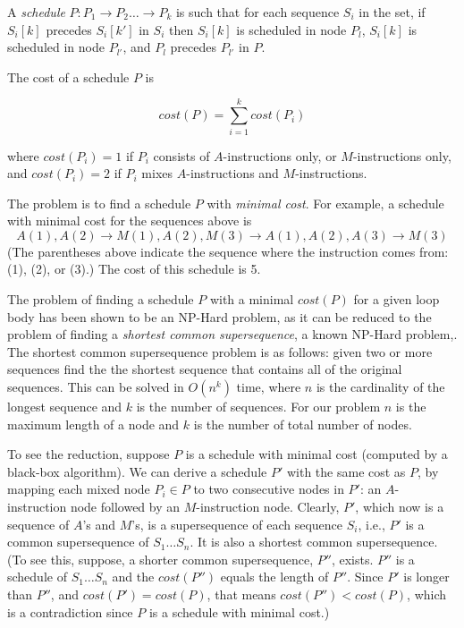 \documentclass[sigconf, screen, natbib=false, dvipsnames, table]{acmart}
\theoremstyle{definition}
\begin{document}
{A \emph{schedule} $P: P_1 \rightarrow P_2 \dots \rightarrow P_k$ is such that for each sequence 
$S_i$ in the set, if $S_i[k]$ precedes $S_i[k']$ in $S_i$ then $S_i[k]$ is scheduled in node $P_l$, $S_i[k]$ 
is scheduled in node $P_{l'}$, and $P_l$ precedes $P_{l'}$ in $P$. 

The cost of a schedule $P$ is 

\begin{equation}
\mathit{cost}(P) = \sum_{i=1}^k \mathit{cost}(P_i)
\end{equation}

where $\mathit{cost}(P_i) = 1$ if $P_i$ consists of $A$-instructions only, or $M$-instructions only, 
and $\mathit{cost}(P_i) = 2$ if $P_i$ mixes $A$-instructions and $M$-instructions. 

The problem is to find a schedule $P$ with \emph{minimal cost}. For example, 
a schedule with minimal cost for the sequences above is
\[ A(1), A(2) \rightarrow M(1), A(2), M(3) \rightarrow A(1), A(2), A(3) \rightarrow M(3) \]
(The parentheses above indicate the sequence where the instruction comes from: (1), (2), or (3).)
The cost of this schedule is 5. 

The problem of finding a schedule $P$ with a minimal $cost(P)$ for a given loop body has been shown
to be an NP-Hard problem, as it can be reduced to the problem of finding a \emph{shortest common supersequence}, 
a known NP-Hard problem\cite{Maier1978},\cite{Vazirani2010}. The shortest common supersequence problem is as follows: 
given two or more sequences find the the shortest sequence that contains all of the original sequences. This can be solved
in $O(n^k)$ time, where $n$ is the cardinality of the longest sequence and $k$ is the 
number of sequences. For our problem $n$ is the maximum length of a node and $k$ is the number
of total number of nodes. %

To see the reduction, 
suppose $P$ is a schedule with minimal cost (computed by a black-box algorithm). 
We can derive a schedule $P'$ with the same cost as $P$, by mapping each mixed node $P_i \in P$ 
to two consecutive nodes in $P'$: an $A$-instruction node followed by an $M$-instruction node.
Clearly, $P'$, which now is a sequence of $A$'s and $M$'s, is a supersequence of each sequence 
$S_i$, i.e., $P'$ is a common supersequence 
of $S_1 \dots S_n$. It is also a shortest common supersequence. (To see this, suppose, a 
shorter common supersequence, $P''$, exists. $P''$ is a schedule of $S_1 \dots S_n$
and the $\mathit{cost}(P'')$ equals the length of $P''$. Since $P'$ is longer than
$P''$, and $\mathit{cost}(P') = \mathit{cost}(P)$, that means $\mathit{cost}(P'') < \mathit{cost}(P)$, 
which is a contradiction since $P$ is a schedule with minimal cost.)
}
\end{document}
